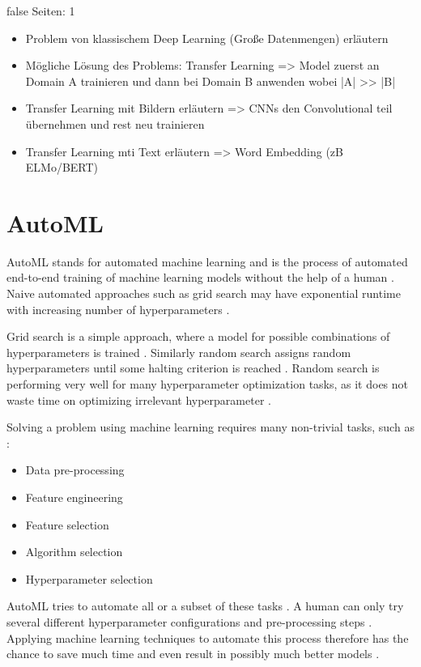 \documentclass[draft,final,oneside]{vutinfth} %
\begin{document}
\if false
Seiten: 1
\begin{itemize}
\item Problem von klassischem Deep Learning (Große Datenmengen) erläutern
\item Mögliche Lösung des Problems: Transfer Learning => Model zuerst an Domain A trainieren und dann bei Domain B anwenden wobei |A| >> |B|
\item Transfer Learning mit Bildern erläutern => CNNs den Convolutional teil übernehmen und rest neu trainieren
\item Transfer Learning mti Text erläutern => Word Embedding (zB ELMo/BERT)
\end{itemize}
\fi


\section{AutoML} \label{automlbackground}

AutoML stands for automated machine learning and is the process of automated end-to-end training of machine learning models without the help of a human \cite{automlsurvey}. Naive automated approaches such as grid search may have exponential runtime with increasing number of hyperparameters \cite{automlsurvey}.

Grid search is a simple approach, where a model for possible combinations of hyperparameters is trained \cite{automlsurvey}. Similarly random search assigns random hyperparameters until some halting criterion is reached \cite{automlsurvey}. Random search is performing very well for many hyperparameter optimization tasks, as it does not waste time on optimizing irrelevant hyperparameter \cite{automlsurvey}.

Solving a problem using machine learning requires many non-trivial tasks, such as \cite{automlsurvey}:

\begin{itemize}
\item Data pre-processing
\item Feature engineering
\item Feature selection
\item Algorithm selection
\item Hyperparameter selection
\end{itemize}

AutoML tries to automate all or a subset of these tasks \cite{automlsurvey}. A human can only try several different hyperparameter configurations and pre-processing steps \cite{automlsurvey}. Applying machine learning techniques to automate this process therefore has the chance to save much time and even result in possibly much better models \cite{automlsurvey}.
\end{document}
